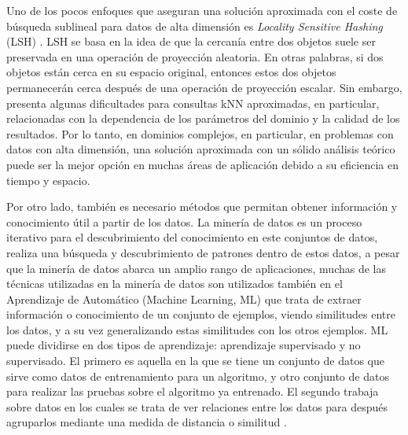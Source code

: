 Uno de los pocos enfoques que aseguran una solución aproximada con el coste de búsqueda sublineal para datos de alta dimensión es \textit{Locality Sensitive Hashing} (LSH) \cite{lsh}. LSH se basa en la idea de que la cercanía entre dos objetos suele ser preservada en una operación de proyección aleatoria. En otras palabras, si dos objetos están cerca  en su espacio original, entonces estos dos objetos permanecerán cerca después de una operación de proyección escalar. Sin embargo, presenta algunas dificultades para consultas kNN aproximadas, en particular, relacionadas con la dependencia de los parámetros del dominio y la calidad de los resultados. Por lo tanto, en dominios complejos, en particular, en problemas con datos con alta dimensión, una solución aproximada con un sólido análisis teórico puede ser la mejor opción en muchas áreas de aplicación debido a su eficiencia en tiempo y espacio.

Por otro lado, también es necesario métodos que permitan obtener información y conocimiento útil a partir de los datos. La minería de datos es un proceso iterativo para el descubrimiento del conocimiento en este conjuntos de datos, realiza una búsqueda y descubrimiento de patrones dentro de estos datos, a pesar que la minería de datos abarca un amplio rango de aplicaciones, muchas de las técnicas utilizadas en la minería de datos son utilizados también en el Aprendizaje de Automático (Machine Learning, ML) que trata de extraer información o conocimiento de un conjunto de ejemplos, viendo similitudes entre los datos, y a su vez generalizando estas similitudes con los otros ejemplos. ML puede dividirse en dos tipos de aprendizaje: aprendizaje supervisado y no supervisado. El primero es aquella en la que se tiene un conjunto de datos que sirve como datos de entrenamiento para un algoritmo, y otro conjunto de datos para realizar las pruebas sobre el algoritmo ya entrenado. El segundo trabaja sobre datos en los cuales se trata de ver relaciones entre los datos para después agruparlos mediante una medida de distancia o similitud \cite{aggarwal2015data}.

